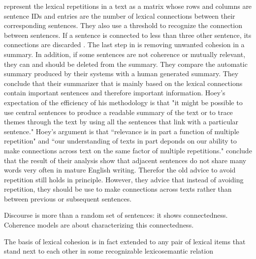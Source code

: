  represent the lexical repetitions in a text as a matrix whose rows and columns are sentence IDs and entries are the number of lexical connections between their corresponding sentences. 
They also use a threshold to recognize the connection between sentences. 
If a sentence is connected to less than three other sentence, its connections are discarded \cite{stotesbury93}. 
The last step in  is removing unwanted cohesion in a summary. 
In addition, if some sentences are not coherence or mutually relevant, they can and should be deleted from the summary. 
They compare the automatic summary produced by their systems with a human generated summary. 
They conclude that their summarizer that is mainly based on the lexical connections contain important sentences and therefore important information. 
Hoey's expectation of the efficiency of his methodology is that "it might be possible to use central sentences to produce a readable summary of the text or to trace themes through the text by using all the sentences that link with a particular sentence."
Hoey's argument is that ``relevance is in part a function of multiple repetition" and ``our understanding of texts in part deponds on our ability to make connections across text on the same factor of multiple repetitions."
  conclude that the result of their analysis show that adjacent sentences do not share many words very often in mature English writing. 
 Therefor the old advice to avoid repetition still holds in principle. 
 However, they advice that instead of avoiding repetition, they should be use to make connections across texts rather than between previous or subsequent sentences. 


 Discourse is more than a random set of sentences: it shows connectedness. 
 Coherence models are about characterizing this connectedness.

 The basis of lexical cohesion is in fact extended to any pair of lexical items that stand next to each other in some recognizable lexicosemantic relation \cite{sandres06} %

